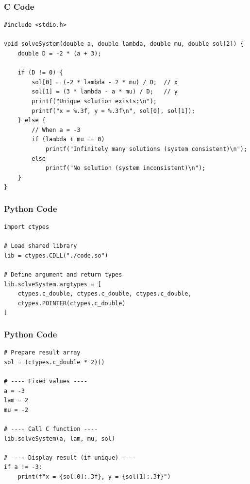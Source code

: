 \documentclass{beamer}
\begin{document}
 \begin{frame}[fragile]
\frametitle{C Code }
\begin{lstlisting}
#include <stdio.h>

void solveSystem(double a, double lambda, double mu, double sol[2]) {
    double D = -2 * (a + 3);

    if (D != 0) {
        sol[0] = (-2 * lambda - 2 * mu) / D;  // x
        sol[1] = (3 * lambda - a * mu) / D;   // y
        printf("Unique solution exists:\n");
        printf("x = %.3f, y = %.3f\n", sol[0], sol[1]);
    } else {
        // When a = -3
        if (lambda + mu == 0)
            printf("Infinitely many solutions (system consistent)\n");
        else
            printf("No solution (system inconsistent)\n");
    }
}
\end{lstlisting}
\end{frame}

 \begin{frame}[fragile]
\frametitle{Python Code }
\begin{lstlisting}
import ctypes

# Load shared library
lib = ctypes.CDLL("./code.so")

# Define argument and return types
lib.solveSystem.argtypes = [
    ctypes.c_double, ctypes.c_double, ctypes.c_double,
    ctypes.POINTER(ctypes.c_double)
]
\end{lstlisting}
\end{frame}

 \begin{frame}[fragile]
\frametitle{Python Code }
\begin{lstlisting}
# Prepare result array
sol = (ctypes.c_double * 2)()

# ---- Fixed values ----
a = -3
lam = 2
mu = -2

# ---- Call C function ----
lib.solveSystem(a, lam, mu, sol)

# ---- Display result (if unique) ----
if a != -3:
    print(f"x = {sol[0]:.3f}, y = {sol[1]:.3f}")

\end{lstlisting}
\end{frame}
\end{document}

